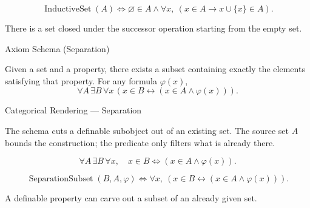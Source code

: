 \begin{remark*}
\[
  \operatorname{InductiveSet}(A)
  \iff
  \varnothing\in A\wedge
  \forall x,\ (x\in A\to x\cup\{x\}\in A).
\]
\end{remark*}

\begin{remark*}[Interpretation]
There is a set closed under the successor operation starting from the empty set.
\end{remark*}

\NoLocalDependencies

\begin{axiombox}{Axiom Schema (Separation)}
\begin{axiom}
\label{ax:separation}
Given a set and a property, there exists a subset containing exactly the
elements satisfying that property. For any formula $\varphi(x)$,
\[
\forall A \, \exists B \,
\forall x \, (x \in B \leftrightarrow (x \in A \land \varphi(x))).
\]
\end{axiom}
\end{axiombox}

\begin{lracategoricalcard}{Categorical Rendering --- Separation}
\begin{center}

\end{center}
\smallskip
\noindent\footnotesize
The schema cuts a definable subobject out of an existing set. The source set
\(A\) bounds the construction; the predicate only filters what is already
there.
\end{lracategoricalcard}

\begin{remark*}
\[
  \forall A\,\exists B\,\forall x,\quad
  x\in B \iff (x\in A\wedge \varphi(x)).
\]
\end{remark*}

\begin{remark*}
\[
  \operatorname{SeparationSubset}(B,A,\varphi)
  \iff
  \forall x,\ (x\in B\leftrightarrow (x\in A\wedge \varphi(x))).
\]
\end{remark*}

\begin{remark*}[Interpretation]
A definable property can carve out a subset of an already given set.
\end{remark*}

\NoLocalDependencies


